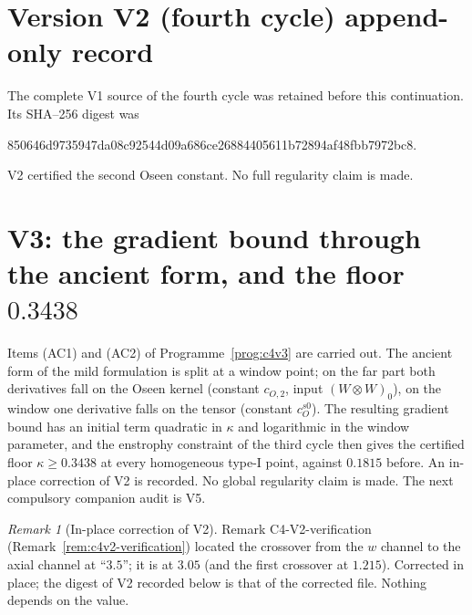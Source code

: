 \documentclass[11pt]{article}
\theoremstyle{plain}
\theoremstyle{definition}
\theoremstyle{remark}
\newtheorem{remark}[theorem]{Remark}
\begin{document}
\section*{Version V2 (fourth cycle) append-only record}

The complete V1 source of the fourth cycle was retained before this
continuation.  Its SHA--256 digest was
\begin{center}\scriptsize\ttfamily
850646d9735947da08c92544d09a686ce26884405611b72894af48fbb7972bc8.
\end{center}
V2 certified the second Oseen constant.  No full regularity claim is
made.

\section{V3: the gradient bound through the ancient form, and the floor \(0.3438\)}
\label{sec:c4v3-entry}

Items (AC1) and (AC2) of Programme~\ref{prog:c4v3} are carried out.
The ancient form of the mild formulation is split at a window
point; on the far part both derivatives fall on the Oseen kernel
(constant \(c_{O,2}\), input \((W\otimes W)_0\)), on the window one derivative falls on
the tensor (constant \(c_O^{s0}\)).  The resulting gradient bound has an
initial term quadratic in \(\kappa\) and logarithmic in the window
parameter, and the enstrophy constraint of the third cycle then
gives the certified floor \(\kappa\ge0.3438\) at every homogeneous type-I
point, against \(0.1815\) before.  An in-place correction of V2 is
recorded.  No global regularity claim is made.  The next compulsory
companion audit is V5.

\begin{remark}[In-place correction of V2]
\label{rem:c4v3-correction}
Remark C4-V2-verification (Remark~\ref{rem:c4v2-verification}) located
the crossover from the \(w\) channel to the axial channel at ``\(3.5\)'';
it is at \(3.05\) (and the first crossover at \(1.215\)).  Corrected in place;
the digest of V2 recorded below is that of the corrected file.
Nothing depends on the value.
\end{remark}

\end{document}
